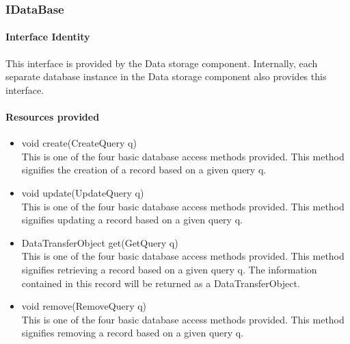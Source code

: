 \subsubsection{IDataBase}
\paragraph{Interface Identity}
This interface is provided by the Data storage component. Internally,
 each separate database instance in the Data storage component also provides
 this interface.
\paragraph{Resources provided}
\begin{itemize}
	\item{void create(CreateQuery q)}\\
	This is one of the four basic database access methods provided.
	This method signifies the creation of a record based on a given 
	query q.
	\item{void update(UpdateQuery q)}\\
	This is one of the four basic database access methods provided.
	This method signifies updating a record based on a given 
	query q.
	
	\item{DataTransferObject get(GetQuery q)}\\
	This is one of the four basic database access methods provided.
	This method signifies retrieving a record based on a given 
	query q. The information contained in this record will be returned
	as a DataTransferObject.
	\item{void remove(RemoveQuery q)}\\
	This is one of the four basic database access methods provided.
	This method signifies removing a record based on a given 
	query q.
	
\end{itemize}

